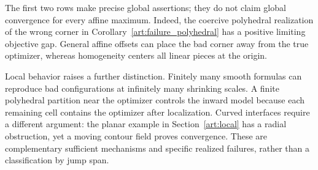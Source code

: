The first two rows make precise global assertions; they do not claim global
convergence for every affine maximum. Indeed, the coercive polyhedral
realization of the wrong corner in Corollary~\ref{art:failure_polyhedral}
has a positive limiting objective gap. General affine offsets can place the
bad corner away from the true optimizer, whereas homogeneity centers all
linear pieces at the origin.

Local behavior raises a further distinction. Finitely many smooth formulas
can reproduce bad configurations at infinitely many shrinking scales.
A finite polyhedral partition near the optimizer controls the inward model
because each remaining cell contains the optimizer after localization.
Curved interfaces require a different argument: the planar example in
Section~\ref{art:local} has a radial obstruction, yet a moving contour field
proves convergence. These are complementary sufficient mechanisms and
specific realized failures, rather than a classification by jump span.
